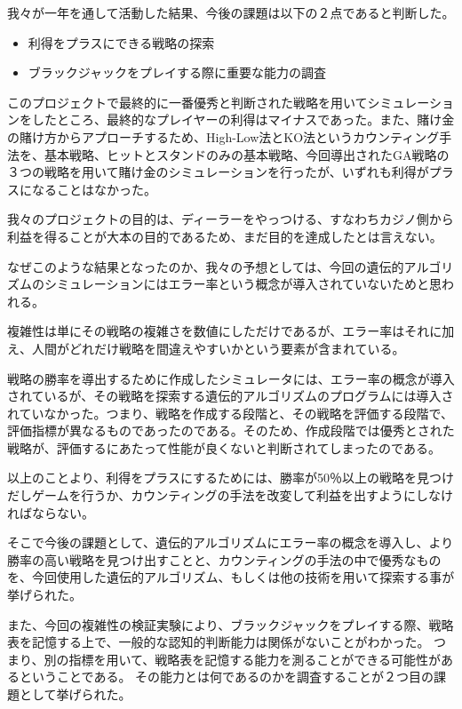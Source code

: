 我々が一年を通して活動した結果、今後の課題は以下の２点であると判断した。

\begin{itemize}
\item 利得をプラスにできる戦略の探索
\item ブラックジャックをプレイする際に重要な能力の調査
\end{itemize}

このプロジェクトで最終的に一番優秀と判断された戦略を用いてシミュレーションをしたところ、最終的なプレイヤーの利得はマイナスであった。また、賭け金の賭け方からアプローチするため、High-Low法とKO法というカウンティング手法を、基本戦略、ヒットとスタンドのみの基本戦略、今回導出されたGA戦略の３つの戦略を用いて賭け金のシミュレーションを行ったが、いずれも利得がプラスになることはなかった。

我々のプロジェクトの目的は、ディーラーをやっつける、すなわちカジノ側から利益を得ることが大本の目的であるため、まだ目的を達成したとは言えない。

なぜこのような結果となったのか、我々の予想としては、今回の遺伝的アルゴリズムのシミュレーションにはエラー率という概念が導入されていないためと思われる。

複雑性は単にその戦略の複雑さを数値にしただけであるが、エラー率はそれに加え、人間がどれだけ戦略を間違えやすいかという要素が含まれている。

戦略の勝率を導出するために作成したシミュレータには、エラー率の概念が導入されているが、その戦略を探索する遺伝的アルゴリズムのプログラムには導入されていなかった。つまり、戦略を作成する段階と、その戦略を評価する段階で、評価指標が異なるものであったのである。そのため、作成段階では優秀とされた戦略が、評価するにあたって性能が良くないと判断されてしまったのである。

以上のことより、利得をプラスにするためには、勝率が50％以上の戦略を見つけだしゲームを行うか、カウンティングの手法を改変して利益を出すようにしなければならない。

そこで今後の課題として、遺伝的アルゴリズムにエラー率の概念を導入し、より勝率の高い戦略を見つけ出すことと、カウンティングの手法の中で優秀なものを、今回使用した遺伝的アルゴリズム、もしくは他の技術を用いて探索する事が挙げられた。

また、今回の複雑性の検証実験により、ブラックジャックをプレイする際、戦略表を記憶する上で、一般的な認知的判断能力は関係がないことがわかった。
つまり、別の指標を用いて、戦略表を記憶する能力を測ることができる可能性があるということである。
その能力とは何であるのかを調査することが２つ目の課題として挙げられた。

